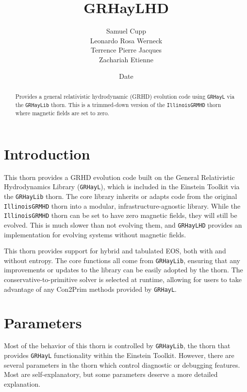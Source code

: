 \documentclass{article}
\newcommand{\grhayl}{\texttt{GRHayL}\xspace}
\newcommand{\glib}{\texttt{GRHayLib}\xspace}
\newcommand{\ghd}{\texttt{GRHayLHD}\xspace}
\newcommand{\igm}{\texttt{IllinoisGRMHD}\xspace}
\begin{document}
\title{GRHayLHD}
\author{Samuel Cupp \\ Leonardo Rosa Werneck \\ Terrence Pierre Jacques \\ Zachariah Etienne}
\date{$ $Date$ $}

\maketitle


\begin{abstract}
Provides a general relativistic hydrodynamic (GRHD) evolution code
using \grhayl via the \glib thorn. This is a trimmed-down version
of the \igm thorn where magnetic fields are set to zero.
\end{abstract}

\section{Introduction}

This thorn provides a GRHD evolution code built on
the General Relativistic Hydrodynamics Library (\grhayl),
which is included in the Einstein Toolkit via the \glib
thorn. The core library inherits or adapts code from the
original \igm thorn into a modular, infrastructure-agnostic
library. While the \igm thorn can be set to have
zero magnetic fields, they will still be evolved. This
is much slower than not evolving them, and \ghd provides an
implementation for evolving systems without magnetic
fields.

This thorn provides support for hybrid and tabulated EOS, both
with and without entropy. The core functions all come from \glib,
ensuring that any improvements or updates to the library can
be easily adopted by the thorn. The conservative-to-primitive
solver is selected at runtime, allowing for users to take
advantage of any Con2Prim methods provided by \grhayl.

\section{Parameters}

Most of the behavior of this thorn is controlled by \glib,
the thorn that provides \grhayl functionality
within the Einstein Toolkit. However, there are several
parameters in the thorn which control diagnostic or debugging
features. Most are self-explanatory, but some parameters deserve
a more detailed explanation.
\end{document}
